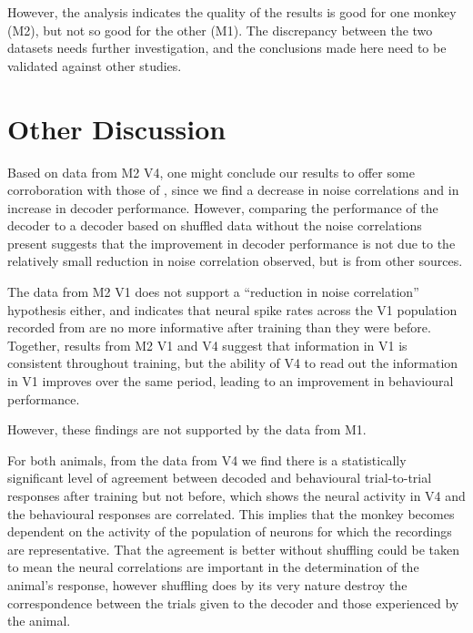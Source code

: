 However, the analysis indicates the quality of the results is good for one monkey (\ac{M2}), but not so good for the other (\ac{M1}).
The discrepancy between the two datasets needs further investigation, and the conclusions made here need to be validated against other studies.


\clearpage
\section{Other Discussion}

Based on data from \ac{M2} \ac{V4}, one might conclude our results to offer some corroboration with those of \citet{Gu2011}, since we find a decrease in noise correlations and in increase in decoder performance.
However, comparing the performance of the decoder to a decoder based on shuffled data without the noise correlations present suggests that the improvement in decoder performance is not due to the relatively small reduction in noise correlation observed, but is from other sources.

The data from \ac{M2} \ac{V1} does not support a ``reduction in noise correlation'' hypothesis either, and indicates that neural spike rates across the \ac{V1} population recorded from are no more informative after training than they were before.
Together, results from \ac{M2} \ac{V1} and \ac{V4} suggest that information in \ac{V1} is consistent throughout training, but the ability of \ac{V4} to read out the information in \ac{V1} improves over the same period, leading to an improvement in behavioural performance.

However, these findings are not supported by the data from \ac{M1}.


For both animals, from the data from \ac{V4} we find there is a statistically significant level of agreement between decoded and behavioural trial-to-trial responses after training but not before, which shows the neural activity in \ac{V4} and the behavioural responses are correlated.
This implies that the monkey becomes dependent on the activity of the population of neurons for which the recordings are representative.
That the agreement is better without shuffling could be taken to mean the neural correlations are important in the determination of the animal's response, however shuffling does by its very nature destroy the correspondence between the trials given to the decoder and those experienced by the animal.
